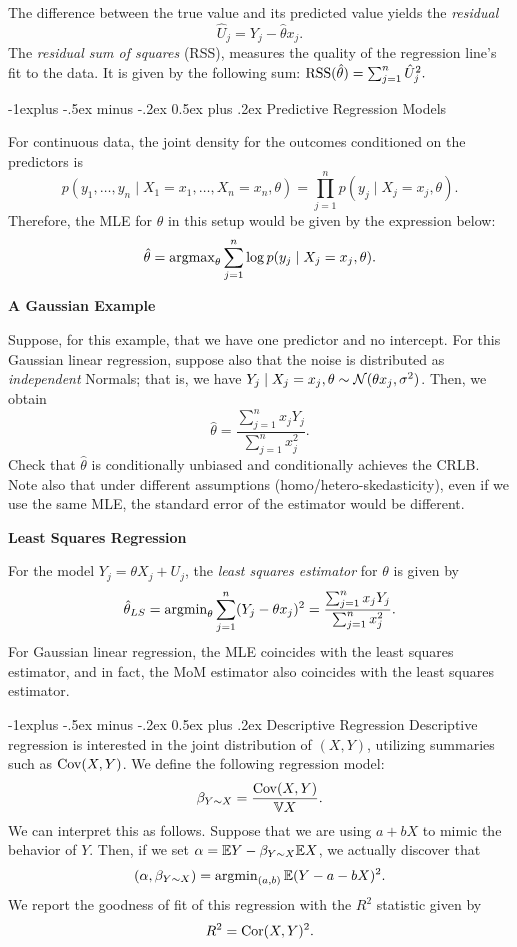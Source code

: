 \documentclass[10pt,landscape]{article}
\makeatletter
\renewcommand{\subsection}{\@startsection{subsection}{2}{0mm}%
                                {-1explus -.5ex minus -.2ex}%
                                {0.5ex plus .2ex}%
                                {\normalfont\normalsize\bfseries}}
\makeatother
\begin{document}
\begin{multicols*}{3}
The difference between the true value and its predicted value yields the \emph{residual} $$\hat{U}_j=Y_j-\hat{\theta}x_j.$$ The \emph{residual sum of squares} (RSS), measures the quality of the regression line's fit to the data. It is given by the following sum: $\operatorname{RSS}(\hat{\theta})=\sum_{j=1}^n \hat{U}_j^2.$


\subsection{Predictive Regression Models}

For continuous data, the joint density for the outcomes conditioned on the predictors is $$p(y_1,\dots,y_n\mid X_1=x_1,\dots,X_n=x_n,\theta)=\prod_{j=1}^n p(y_j\mid X_j=x_j,\theta).$$ Therefore, the MLE for $\theta$ in this setup would be given by the expression below: $$\hat{\theta}=\operatorname{argmax}_\theta \sum_{j=1}^n \log p(y_j\mid X_j=x_j,\theta).$$

\textbf{A Gaussian Example}

Suppose, for this example, that we have one predictor and no intercept. For this Gaussian linear regression, suppose also that the noise is distributed as \emph{independent} Normals; that is, we have $Y_j\mid X_j=x_j,\theta \sim \mathcal{N}(\theta x_j,\sigma^2)$. Then, we obtain $$\hat{\theta}=\frac{\sum_{j=1}^n x_jY_j}{\sum_{j=1}^n x_j^2}.$$ Check that $\hat{\theta}$ is conditionally unbiased and conditionally achieves the CRLB. Note also that under different assumptions (homo/hetero-skedasticity), even if we use the same MLE, the standard error of the estimator would be different.

\textbf{Least Squares Regression}

For the model $Y_j=\theta X_j+U_j$, the \emph{least squares estimator} for $\theta$ is given by $$\hat{\theta}_{LS}=\operatorname{argmin}_\theta \sum_{j=1}^n (Y_j-\theta x_j)^2=\frac{\sum_{j=1}^n x_jY_j}{\sum_{j=1}^n x_j^2}.$$ For Gaussian linear regression, the MLE coincides with the least squares estimator, and in fact, the MoM estimator also coincides with the least squares estimator.

\subsection{Descriptive Regression}
Descriptive regression is interested
in the joint distribution of $(X,Y)$, utilizing summaries such as $\operatorname{Cov}(X, Y)$. We define the following regression model: $$\beta_{Y\sim X} =\frac{\operatorname{Cov}(X,Y)}{\mathbb{V} X}.$$ We can interpret this as follows. Suppose that we are using $a + bX$ to mimic the behavior of $Y$. Then, if we set $\alpha = \mathbb{E} Y -\beta_{Y\sim X} \mathbb{E} X$, we actually discover that $$(\alpha,\beta_{Y\sim X})=\operatorname{argmin}_{(a,b)}\mathbb{E} (Y-a-bX)^2.$$ We report the goodness of fit of this regression with the $R^2$ statistic given by $$R^2=\operatorname{Cor}(X,Y)^2.$$


\end{multicols*}
\end{document}
